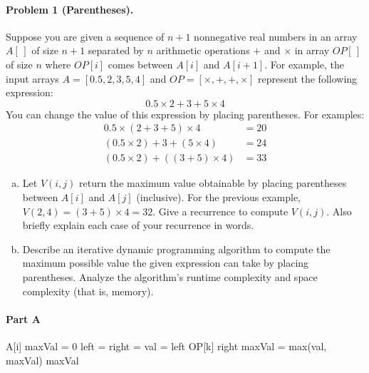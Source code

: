 \documentclass[11pt]{article}
\begin{document}
\paragraph{Problem 1 (Parentheses).} Suppose you are given a sequence of $n+1$ nonnegative real numbers in an array $A[\,]$ of size $n+1$ separated by $n$ arithmetic operations $+$ and $\times$ in array $OP[\,]$ of size $n$ where $OP[i]$ comes between $A[i]$ and $A[i+1]$. For example, the input arrays $A = [0.5, 2, 3, 5, 4]$ and $OP = [\times, +, +, \times]$ represent the following expression:
\[ 0.5 \times 2 + 3 + 5 \times 4 \]
You can change the value of this expression by placing parentheses. For examples:
\begin{align*}
	0.5 \times (2 + 3 + 5) \times 4 &= 20 \\
    (0.5 \times 2) + 3 + (5 \times 4) &=24 \\
    (0.5 \times 2) + \left( (3 + 5) \times 4\right) &= 33
\end{align*}
\begin{enumerate}[(a)]
    \item Let $V(i, j)$ return the maximum value obtainable by placing parentheses between $A[i]$ and $A[j]$ (inclusive). For the previous example, $V(2,4)=(3+5)\times 4=32$. Give a recurrence to compute $V(i, j)$. Also briefly explain each case of your recurrence in words.

    \item Describe an iterative dynamic programming algorithm to compute the maximum possible value the given expression can take by placing parentheses. Analyze the algorithm's runtime complexity and space complexity (that is, memory).
    
\end{enumerate}

\paragraph{Part A}

\begin{algorithmic}[1]
            \State \Return A[i]
        \EndIf
        \State maxVal = 0
            \State left = 
            \State right = 
            \State val = left OP[k] right
            \State maxVal = max(val, maxVal)
        \EndFor
        \State \Return maxVal
    \EndProcedure
\end{algorithmic}
\end{document}
